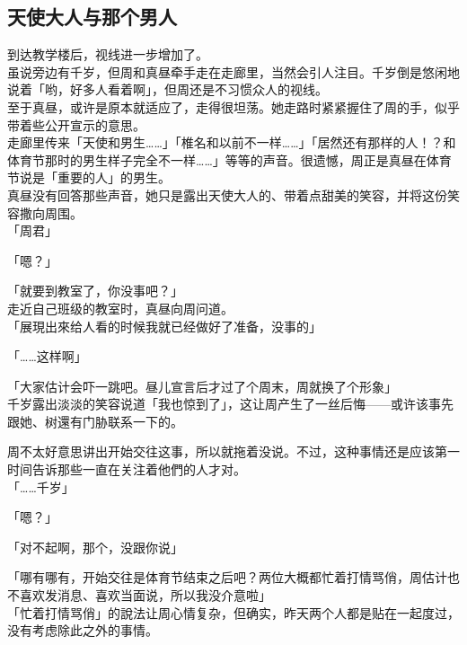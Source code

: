 \subsection{天使大人与那个男人}

到达教学楼后，视线进一步增加了。\\

虽说旁边有千岁，但周和真昼牵手走在走廊里，当然会引人注目。千岁倒是悠闲地说着「哟，好多人看着啊」，但周还是不习惯众人的视线。\\

至于真昼，或许是原本就适应了，走得很坦荡。她走路时紧紧握住了周的手，似乎带着些公开宣示的意思。\\

走廊里传来「天使和男生……」「椎名和以前不一样……」「居然还有那样的人！？和体育节那时的男生样子完全不一样……」等等的声音。很遗憾，周正是真昼在体育节说是「重要的人」的男生。\\

真昼没有回答那些声音，她只是露出天使大人的、带着点甜美的笑容，并将这份笑容撒向周围。\\

「周君」

「嗯？」

「就要到教室了，你没事吧？」\\

走近自己班级的教室时，真昼向周问道。\\

「展現出來给人看的时候我就已经做好了准备，没事的」

「……这样啊」

「大家估计会吓一跳吧。昼儿宣言后才过了个周末，周就换了个形象」\\

千岁露出淡淡的笑容说道「我也惊到了」，这让周产生了一丝后悔——或许该事先跟她、树還有门胁联系一下的。

周不太好意思讲出开始交往这事，所以就拖着没说。不过，这种事情还是应该第一时间告诉那些一直在关注着他們的人才对。\\

「……千岁」

「嗯？」

「对不起啊，那个，没跟你说」

「哪有哪有，开始交往是体育节结束之后吧？两位大概都忙着打情骂俏，周估计也不喜欢发消息、喜欢当面说，所以我没介意啦」\\

「忙着打情骂俏」的說法让周心情复杂，但确实，昨天两个人都是贴在一起度过，没有考虑除此之外的事情。


